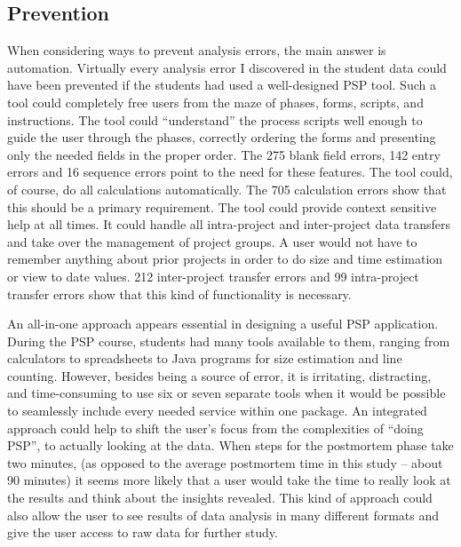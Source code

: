 \subsection{\label{section:AnalysisErrorPrevention}Prevention}

When considering ways to prevent analysis errors, the main answer is
automation.  Virtually every analysis error I discovered in the student
data could have been prevented if the students had used a well-designed PSP
tool. Such a tool could completely free users from the maze of phases,
forms, scripts, and instructions. The tool could ``understand'' the process
scripts well enough to guide the user through the phases, correctly
ordering the forms and presenting only the needed fields in the proper
order. The 275 blank field errors, 142 entry errors and 16 sequence errors
point to the need for these features.  The tool could, of course, do all
calculations automatically.  The 705 calculation errors show that this
should be a primary requirement. The tool could provide context sensitive
help at all times.  It could handle all intra-project and inter-project
data transfers and take over the management of project groups.  A user
would not have to remember anything about prior projects in order to do
size and time estimation or view to date values.  212 inter-project
transfer errors and 99 intra-project transfer errors show that this kind of
functionality is necessary.

An all-in-one approach appears essential in designing a useful PSP
application.  During the PSP course, students had many tools available to
them, ranging from calculators to spreadsheets to Java programs for size
estimation and line counting.  However, besides being a source of error, it
is irritating, distracting, and time-consuming to use six or seven separate
tools when it would be possible to seamlessly include every needed service
within one package.  An integrated approach could help to shift the user's
focus from the complexities of ``doing PSP'', to actually looking at the
data.  When steps for the postmortem phase take two minutes, (as opposed to
the average postmortem time in this study -- about 90 minutes) %
it seems more likely that a user would take the time to really look at the
results and think about the insights revealed.  This kind of approach could
also allow the user to see results of data analysis in many different
formats and give the user access to raw data for further study.

